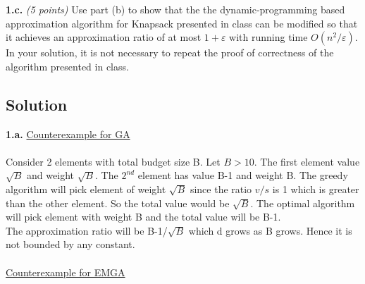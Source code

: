 \documentclass[11pt]{article}
\begin{document}
{\bf 1.c.} \emph{(5 points)}
Use part (b) to show that the the dynamic-programming
based approximation algorithm for Knapsack presented in class
can be modified so that it achieves an
approximation ratio of at most $1+\varepsilon$
with running time $O(n^2 / \varepsilon)$.
In your solution, it is not necessary to repeat
the proof of correctness of the algorithm presented in class.

\newpage
\subsection{Solution}

{\bf 1.a.} \underline{Counterexample for GA}\\\\
Consider 2 elements with total budget size B. Let $B > 10$. The first element value $\sqrt{B}$ and weight $\sqrt{B}$. The $2^{nd}$ element has value B-1 and weight B. The greedy algorithm will pick element of weight $\sqrt{B}$ since the ratio $v /s$ is 1 which is greater than the other element. So the total value would be $\sqrt{B}$. The optimal algorithm will pick element with weight B and the total value will be B-1. \\
The approximation ratio will be B-1/$\sqrt{B}$ which d grows as B grows. Hence it is not bounded by any constant.\\\\
\underline{Counterexample for EMGA}\\
\end{document}
